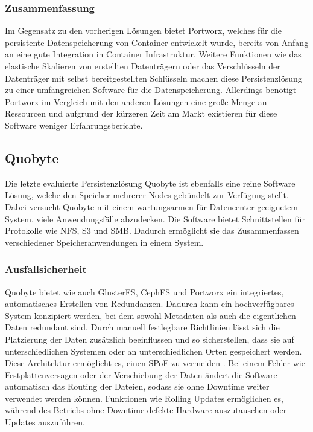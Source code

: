 \subsubsection{Zusammenfassung}
Im Gegensatz zu den vorherigen Lösungen bietet Portworx, welches für die persistente Datenspeicherung von Container entwickelt wurde, bereits von Anfang an eine gute Integration in Container Infrastruktur. Weitere Funktionen wie das elastische Skalieren von erstellten Datenträgern oder das Verschlüsseln der Datenträger mit selbst bereitgestellten Schlüsseln machen diese Persistenzlösung zu einer umfangreichen Software für die Datenspeicherung.
Allerdings benötigt Portworx im Vergleich mit den anderen Lösungen eine große Menge an Ressourcen und aufgrund der kürzeren Zeit am Markt existieren für diese Software weniger Erfahrungsberichte.

\subsection{Quobyte}
Die letzte evaluierte Persistenzlösung Quobyte ist ebenfalls eine reine Software Lösung, welche den Speicher mehrerer Nodes gebündelt zur Verfügung stellt. Dabei versucht Quobyte mit einem wartungsarmen für Datencenter geeignetem System, viele Anwendungsfälle abzudecken. Die Software bietet Schnittstellen für Protokolle wie NFS, S3 und SMB. Dadurch ermöglicht sie das Zusammenfassen verschiedener Speicheranwendungen in einem System.

\subsubsection{Ausfallsicherheit}
Quobyte bietet wie auch GlusterFS, CephFS und Portworx ein integriertes, automatisches Erstellen von Redundanzen. Dadurch kann ein hochverfügbares System konzipiert werden, bei dem sowohl Metadaten als auch die eigentlichen Daten redundant sind. Durch manuell festlegbare Richtlinien lässt sich die Platzierung der Daten zusätzlich beeinflussen und so sicherstellen, dass sie auf unterschiedlichen Systemen oder an unterschiedlichen Orten gespeichert werden. Diese Architektur ermöglicht es, einen \ac{SPoF} zu vermeiden \cite{quobyte:whitepaper}. Bei einem Fehler wie Festplattenversagen oder der Verschiebung der Daten ändert die Software automatisch das Routing der Dateien, sodass sie ohne Downtime weiter verwendet werden können. Funktionen wie Rolling Updates ermöglichen es, während des Betriebs ohne Downtime defekte Hardware auszutauschen oder Updates auszuführen.

